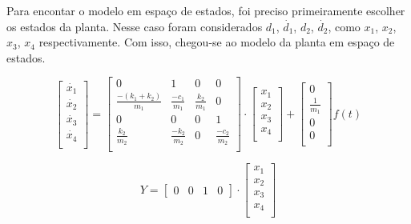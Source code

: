 \documentclass{ifacconf}
\begin{document}
Para encontar o modelo em espaço de estados, foi preciso primeiramente escolher os estados da planta. Nesse caso foram considerados $d_{1}$, $\dot{d_{1}}$, $d_{2}$, $\dot{d_{2}}$, como $x_{1}$, $x_{2}$, $x_{3}$, $x_{4}$ respectivamente. Com isso, chegou-se ao modelo da planta em espaço de estados.

\begin{equation}
    \begin{bmatrix}
        \dot{x_{1}} \\
        \dot{x_{2}} \\
        \dot{x_{3}} \\
        \dot{x_{4}} \\
    \end{bmatrix}
    =
    \begin{bmatrix}
        0 & 1 & 0 & 0\\
        \frac{-(k_{1}+k_{2})}{m_{1}} & \frac{-c_{1}}{m_{1}} & \frac{k_{2}}{m_{1}} & 0\\
        0 & 0 & 0 & 1\\
        \frac{k_{2}}{m_{2}} & \frac{-k_{2}}{m_{2}} & 0 & \frac{-c_{2}}{m_{2}}\\
    \end{bmatrix}
    \cdot
    \begin{bmatrix}
        x_{1} \\
        x_{2} \\
        x_{3} \\
        x_{4} \\
    \end{bmatrix}
    +
    \begin{bmatrix}
        0 \\
        \frac{1}{m_{1}} \\
        0 \\
        0 \\
    \end{bmatrix}
    f(t)
    \label{eq:Espaco de estados entrada}
    \end{equation}

    \begin{equation}
            Y
        =
        \begin{bmatrix}
            0 & 0 & 1 & 0
        \end{bmatrix}
        \cdot
        \begin{bmatrix}
            x_{1} \\
            x_{2} \\
            x_{3} \\
            x_{4} \\
        \end{bmatrix}
        \label{eq:Espaco de estados saida}
    \end{equation}
        
\end{document}
